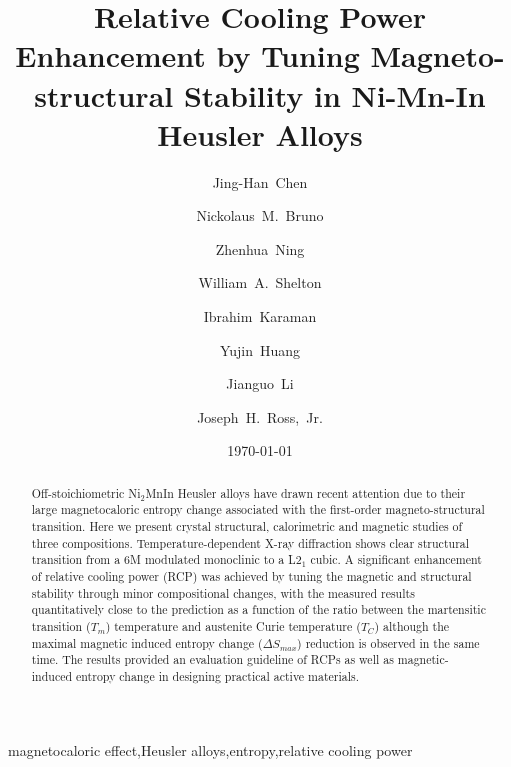 \documentclass[sort&compress,twocolumn,3p]{elsarticle}
\begin{document}
\title{Relative Cooling Power Enhancement by Tuning Magneto-structural Stability in Ni-Mn-In Heusler Alloys}

\author[1]{Jing-Han~Chen}
\author[2]{Nickolaus~M.~Bruno}
\author[1]{Zhenhua~Ning}
\author[3]{William~A.~Shelton}
\author[4,5]{Ibrahim~Karaman}
\author[6]{Yujin~Huang}
\author[6]{Jianguo~Li}
\author[7,4]{Joseph~H.~Ross,~Jr.}

\address[1]{Department of Physics and Astronomy, Louisiana State University, Baton Rouge, Louisiana 70803, USA}
\address[2]{Department of Mechanical Engineering, South Dakota School of Mines and Technology,	Rapid City, South Dakota 57701, USA}
\address[3]{Department of Chemical Engineering, Louisiana State University, Baton Rouge, Louisiana 70803, USA}
\address[4]{Department of Materials Science and Engineering, Texas A\&M University, College Station, Texas 77843, USA}
\address[5]{Department of Mechanical Engineering, Texas A\&M University, College Station, Texas 77843, USA}
\address[6]{School of Materials Science and Engineering, Shanghai Jiaotong University, Shanghai, 200240, China}
\address[7]{Department of Physics and Astronomy, Texas A\&M University, College Station, Texas 77843, USA}

\date{\today}

\begin{abstract}
Off-stoichiometric Ni$_2$MnIn Heusler alloys have drawn recent attention due to their large magnetocaloric entropy change associated with the first-order magneto-structural transition.
Here we present crystal structural, calorimetric and magnetic studies of three compositions.
Temperature-dependent X-ray diffraction shows clear structural transition from a 6M modulated monoclinic to a L2$_1$ cubic.
A significant enhancement of relative cooling power (RCP) was achieved by tuning the magnetic and structural stability through minor compositional changes, 
with the measured results quantitatively close to the prediction as a function of the ratio between the martensitic transition ($T_m$) temperature and austenite Curie temperature ($T_C$)
		although the maximal magnetic induced entropy change ($\Delta S_{max}$) reduction is observed in the same time.
The results provided an evaluation guideline of RCPs as well as magnetic-induced entropy change in designing practical active materials.
\end{abstract}

\begin{keyword}
magnetocaloric effect\sep Heusler alloys\sep entropy\sep relative cooling power
\end{keyword}
\end{document}
